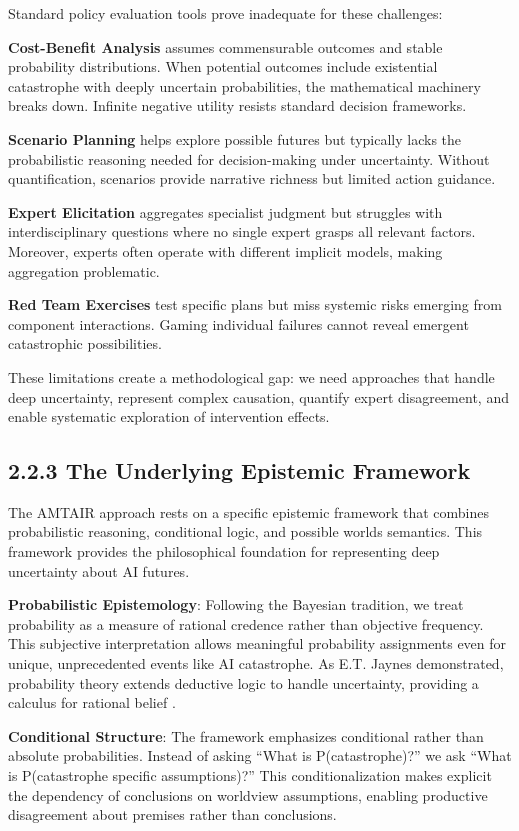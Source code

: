 \documentclass[
  11pt,
  letterpaper,
]{book}
\begin{document}
Standard policy evaluation tools prove inadequate for these challenges:

\textbf{Cost-Benefit Analysis} assumes commensurable outcomes and stable
probability distributions. When potential outcomes include existential
catastrophe with deeply uncertain probabilities, the mathematical
machinery breaks down. Infinite negative utility resists standard
decision frameworks.

\textbf{Scenario Planning} helps explore possible futures but typically
lacks the probabilistic reasoning needed for decision-making under
uncertainty. Without quantification, scenarios provide narrative
richness but limited action guidance.

\textbf{Expert Elicitation} aggregates specialist judgment but struggles
with interdisciplinary questions where no single expert grasps all
relevant factors. Moreover, experts often operate with different
implicit models, making aggregation problematic.

\textbf{Red Team Exercises} test specific plans but miss systemic risks
emerging from component interactions. Gaming individual failures cannot
reveal emergent catastrophic possibilities.

These limitations create a methodological gap: we need approaches that
handle deep uncertainty, represent complex causation, quantify expert
disagreement, and enable systematic exploration of intervention effects.

\subsection{2.2.3 The Underlying Epistemic
Framework}\label{the-underlying-epistemic-framework}

The AMTAIR approach rests on a specific epistemic framework that
combines probabilistic reasoning, conditional logic, and possible worlds
semantics. This framework provides the philosophical foundation for
representing deep uncertainty about AI futures.

\textbf{Probabilistic Epistemology}: Following the Bayesian tradition,
we treat probability as a measure of rational credence rather than
objective frequency. This subjective interpretation allows meaningful
probability assignments even for unique, unprecedented events like AI
catastrophe. As E.T. Jaynes demonstrated, probability theory extends
deductive logic to handle uncertainty, providing a calculus for rational
belief \textcite{jaynes2003}.

\textbf{Conditional Structure}: The framework emphasizes conditional
rather than absolute probabilities. Instead of asking ``What is
P(catastrophe)?'' we ask ``What is P(catastrophe \textbar{} specific
assumptions)?'' This conditionalization makes explicit the dependency of
conclusions on worldview assumptions, enabling productive disagreement
about premises rather than conclusions.
\end{document}

